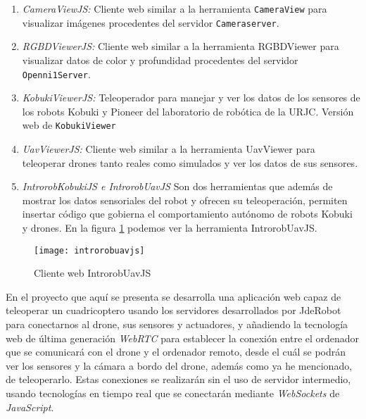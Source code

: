 \begin{enumerate}

\item \emph{CameraViewJS:} Cliente web similar a la herramienta \texttt{CameraView} para visualizar imágenes procedentes del servidor \texttt{Cameraserver}. 

\item \emph{RGBDViewerJS:} Cliente web similar a la herramienta RGBDViewer para visualizar datos de color y profundidad procedentes del servidor \texttt{Openni1Server}.
  
\item \emph{KobukiViewerJS:} Teleoperador para manejar y ver los datos de los sensores de los robots Kobuki y Pioneer del laboratorio de robótica de la URJC. Versión web de \texttt{KobukiViewer}
  
  
\item \emph{UavViewerJS:} Cliente web similar a la herramienta UavViewer para teleoperar drones tanto reales como simulados y ver los datos de sus sensores.
  
  
\item \emph{IntrorobKobukiJS e IntrorobUavJS} Son dos herramientas que además de mostrar los datos sensoriales del robot y ofrecen su teleoperación, permiten insertar código que gobierna el comportamiento autónomo de robots Kobuki y drones. En la figura \ref{fig:introrobuavjs} podemos ver la herramienta IntrorobUavJS.

\end{enumerate}

\begin{figure}[htb]
\centering
\texttt{[image: introrobuavjs]}
\caption{Cliente web IntrorobUavJS}
\label{fig:introrobuavjs}
\end{figure}


En el proyecto que aquí se presenta se desarrolla una aplicación web capaz de teleoperar un cuadricoptero usando los servidores desarrollados por JdeRobot para conectarnos al drone, sus sensores y actuadores, y añadiendo la tecnología web de última generación \emph{WebRTC} para establecer la conexión entre el ordenador que se comunicará con el drone y el ordenador remoto, desde el cuál se podrán ver los sensores y la cámara a bordo del drone, además como ya he mencionado, de teleoperarlo. Estas conexiones se realizarán sin el uso de servidor intermedio, usando tecnologías en tiempo real que se conectarán mediante \emph{WebSockets} de \emph{JavaScript}.\\



